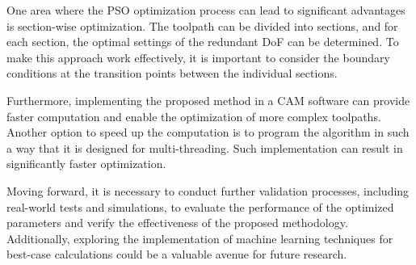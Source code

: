 One area where the \acrshort{PSO} optimization process can lead to significant advantages is section-wise optimization. The toolpath can be divided into sections, and for each section, the optimal settings of the redundant \acrshort{DoF} can be determined. To make this approach work effectively, it is important to consider the boundary conditions at the transition points between the individual sections.

Furthermore, implementing the proposed method in a \acrshort{CAM} software can provide faster computation and enable the optimization of more complex toolpaths. Another option to speed up the computation is to program the algorithm in such a way that it is designed for multi-threading. Such implementation can result in significantly faster optimization.  

Moving forward, it is necessary to conduct further validation processes, including real-world tests and simulations, to evaluate the performance of the optimized parameters and verify the effectiveness of the proposed methodology. Additionally, exploring the implementation of machine learning techniques for best-case calculations could be a valuable avenue for future research.


